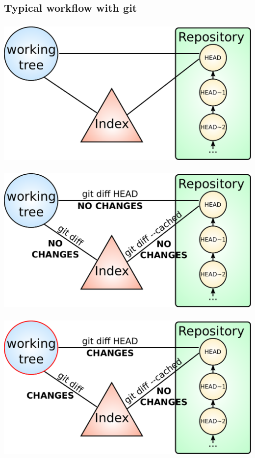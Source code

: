 \subsection{Typical workflow with git}
\begin{frame}
  \frametitle{\insertsubsection}
  \begin{center}
    \includegraphics[width=1.0\textwidth]{images/pdf/git-detailed-1.pdf}
  \end{center}
\end{frame}
\begin{frame}
  \frametitle{\insertsubsection}
  \begin{center}
    \includegraphics[width=1.0\textwidth]{images/pdf/git-detailed-2.pdf}
  \end{center}
\end{frame}
\begin{frame}
  \frametitle{\insertsubsection}
  \begin{center}
    \includegraphics[width=1.0\textwidth]{images/pdf/git-detailed-3.pdf}
  \end{center}
\end{frame}
